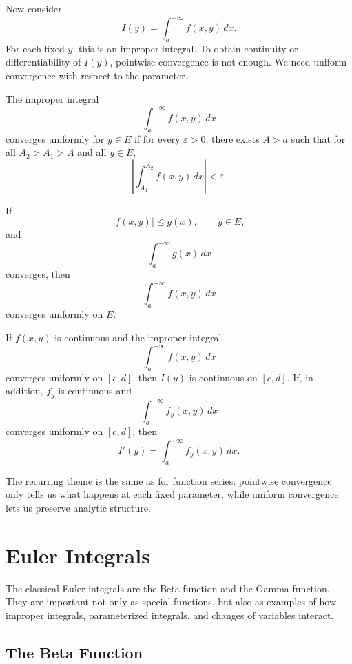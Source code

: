 Now consider
\[
    I(y)=\int_a^{+\infty} f(x,y)\,dx.
\]
For each fixed $y$, this is an improper integral. To obtain continuity or differentiability of $I(y)$, pointwise convergence is not enough. We need uniform convergence with respect to the parameter.

\begin{definition}
The improper integral
\[
    \int_a^{+\infty} f(x,y)\,dx
\]
converges uniformly for $y\in E$ if for every $\varepsilon>0$, there exists $A>a$ such that for all $A_2>A_1>A$ and all $y\in E$,
\[
    \left|\int_{A_1}^{A_2} f(x,y)\,dx\right|<\varepsilon.
\]
\end{definition}

\begin{theorem}
If
\[
    |f(x,y)|\le g(x),
    \qquad y\in E,
\]
and
\[
    \int_a^{+\infty}g(x)\,dx
\]
converges, then
\[
    \int_a^{+\infty}f(x,y)\,dx
\]
converges uniformly on $E$.
\end{theorem}

\begin{theorem}
If $f(x,y)$ is continuous and the improper integral
\[
    \int_a^{+\infty} f(x,y)\,dx
\]
converges uniformly on $[c,d]$, then $I(y)$ is continuous on $[c,d]$.
If, in addition, $f_y$ is continuous and
\[
    \int_a^{+\infty} f_y(x,y)\,dx
\]
converges uniformly on $[c,d]$, then
\[
    I'(y)=\int_a^{+\infty} f_y(x,y)\,dx.
\]
\end{theorem}

\begin{note}
The recurring theme is the same as for function series: pointwise convergence only tells us what happens at each fixed parameter, while uniform convergence lets us preserve analytic structure.
\end{note}

\section{Euler Integrals}

The classical Euler integrals are the Beta function and the Gamma function. They are important not only as special functions, but also as examples of how improper integrals, parameterized integrals, and changes of variables interact.

\subsection{The Beta Function}

